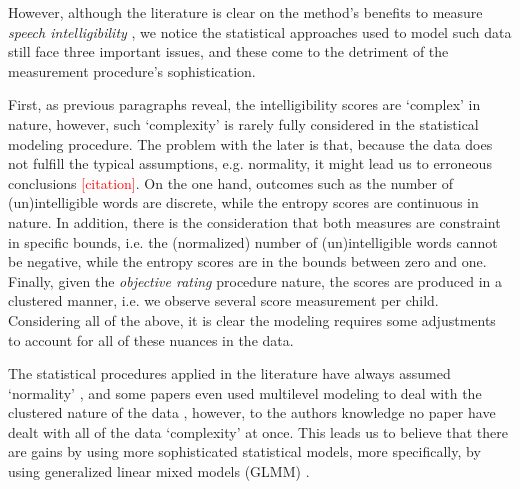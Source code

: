 However, although the literature is clear on the method's benefits to measure \textit{speech intelligibility} \citep{Boonen_et_al_2020, Boonen_et_al_2021, Hustad_et_al_2020}, we notice the statistical approaches used to model such data still face three important issues, and these come to the detriment of the measurement procedure's sophistication. 

First, as previous paragraphs reveal, the intelligibility scores are `complex' in nature, however, such `complexity' is rarely fully considered in the statistical modeling procedure. The problem with the later is that, because the data does not fulfill the typical assumptions, e.g. normality, it might lead us to erroneous conclusions \textcolor{red}{[citation]}. On the one hand, outcomes such as the number of (un)intelligible words are discrete, while the entropy scores are continuous in nature. In addition, there is the consideration that both measures are constraint in specific bounds, i.e. the (normalized) number of (un)intelligible words cannot be negative, while the entropy scores are in the bounds between zero and one. Finally, given the \textit{objective rating} procedure nature, the scores are produced in a clustered manner, i.e. we observe several score measurement per child. Considering all of the above, it is clear the modeling requires some adjustments to account for all of these nuances in the data.

The statistical procedures applied in the literature have always assumed `normality' \citep{Boonen_et_al_2021, Flipsen_et_al_2006, Hustad_et_al_2020}, and some papers even used multilevel modeling to deal with the clustered nature of the data \citep{Boonen_et_al_2021}, however, to the authors knowledge no paper have dealt with all of the data `complexity' at once. This leads us to believe that there are gains by using more sophisticated statistical models, more specifically, by using generalized linear mixed models (GLMM) \citep{Breslow_et_al_1993, Nelder_et_al_1996, Nelder_et_al_1983}.  

\begin{comment}
Second, many factors are though to influence intelligibility, but the framework in which they are analyzed does not allow to make causal hypothesis. Moreover, it might suffer from problems like including variables that are multicollinear
- hypothesis seem clear cut with classical statistics, but bayesian modeling allow us to have a more nuanced view of the models, their inferences and conclusions

Third, in lieu with the previous no attempt on constructing an actual intelligibility score is made, and therefore, the modeling procedure is applied on surrogate measures, like entropy, but not directly on what it is intended to be measure. For instance, \citet{Flipsen_2006} uses 

From the previous, we believe the field can further benefit from using much more sophisticated statistical analysis tools, than the ones currently used. 
\end{comment}


